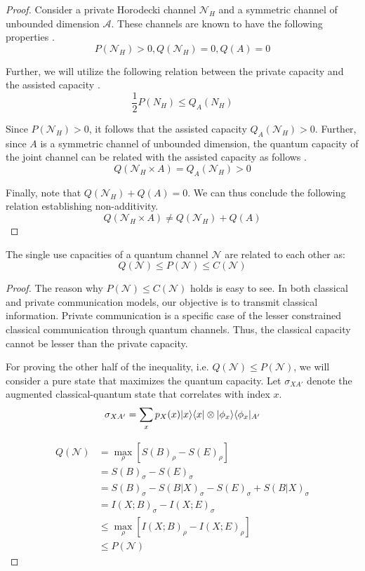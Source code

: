 \begin{proof}
Consider a private Horodecki channel $\mathcal{N}_H$ and a symmetric channel of unbounded dimension $\mathcal{A}$. These channels are known to have the following properties \cite{Horodecki_1996} \cite{Horodecki_1997} \cite{Smith_2008_Symmetric}.
$$P(\mathcal{N}_H) > 0, Q(\mathcal{N}_H) = 0, Q(A) = 0$$

Further, we will utilize the following relation between the private capacity and the assisted capacity \cite{Smith_2008}.
$$\frac{1}{2} P(N_H) \leq Q_A(N_H)$$

Since $P(\mathcal{N}_H) > 0$, it follows that the assisted capacity $Q_A(\mathcal{N}_H) > 0$. Further, since $A$ is a symmetric channel of unbounded dimension, the quantum capacity of the joint channel can be related with the assisted capacity as follows \cite{Smith_2008_Symmetric}.
$$Q(\mathcal{N}_H \times A) = Q_A(\mathcal{N}_H) > 0$$

Finally, note that $Q(\mathcal{N}_H) + Q(A) = 0$. We can thus conclude the following relation establishing non-additivity.
$$Q(\mathcal{N}_H \times A) \neq Q(\mathcal{N}_H) + Q(A)$$
\end{proof}

\begin{theorem}
The single use capacities of a quantum channel $\mathcal{N}$ are related to each other as:
$$Q(\mathcal{N}) \leq P(\mathcal{N}) \leq C(\mathcal{N})$$
\end{theorem}

\begin{proof}
The reason why $P(\mathcal{N}) \leq C(\mathcal{N})$ holds is easy to see. In both classical and private communication models, our objective is to transmit classical information. Private communication is a specific case of the lesser constrained classical communication through quantum channels. Thus, the classical capacity cannot be lesser than the private capacity.

For proving the other half of the inequality, i.e. $Q(\mathcal{N}) \leq P(\mathcal{N})$, we will consider a pure state that maximizes the quantum capacity. Let $\sigma_{XA'}$ denote the augmented classical-quantum state that correlates with index $x$.
$$\sigma_{XA'} = \sum_{x} p_X(x) \lvert x\rangle\langle x\rvert \otimes \lvert\phi_x\rangle\langle\phi_x\rvert_{A'}$$

\begin{align*}
Q(\mathcal{N}) &= \max_{\rho} \left[ S(B)_{\rho} - S(E)_{\rho} \right] \\
&= S(B)_{\sigma} - S(E)_{\sigma}\\
&= S(B)_{\sigma} - S(B|X)_{\sigma} - S(E)_{\sigma} + S(B|X)_{\sigma}\\
&= I(X;B)_{\sigma} - I(X;E)_{\sigma} \\
&\leq \max_{\rho} \left[ I(X;B)_{\rho} - I(X;E)_{\rho} \right] \\
&\leq P(\mathcal{N})
\end{align*}
\end{proof}
